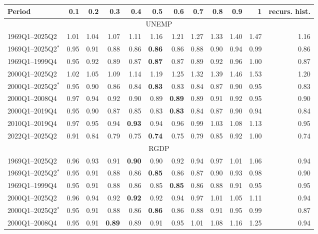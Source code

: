 \begin{tabular}{lrrrrrrrrrrr}
\hline
Period & 0.1 & 0.2 & 0.3 & 0.4 & 0.5 & 0.6 & 0.7 & 0.8 & 0.9 & 1 & recurs. hist. \\
\hline
\multicolumn{12}{c}{UNEMP} \\
1969Q1--2025Q2 & 1.01 & 1.04 & 1.07 & 1.11 & 1.16 & 1.21 & 1.27 & 1.33 & 1.40 & 1.47 & 1.16 \\
1969Q1--2025Q2$^*$ & 0.95 & 0.91 & 0.88 & 0.86 & \textbf{0.86} & 0.86 & 0.88 & 0.90 & 0.94 & 0.99 & 0.86 \\
1969Q1--1999Q4 & 0.95 & 0.92 & 0.89 & 0.87 & \textbf{0.87} & 0.87 & 0.89 & 0.92 & 0.96 & 1.00 & 0.87 \\
2000Q1--2025Q2 & 1.02 & 1.05 & 1.09 & 1.14 & 1.19 & 1.25 & 1.32 & 1.39 & 1.46 & 1.53 & 1.20 \\
2000Q1--2025Q2$^*$ & 0.95 & 0.90 & 0.86 & 0.84 & \textbf{0.83} & 0.83 & 0.84 & 0.87 & 0.90 & 0.95 & 0.83 \\
2000Q1--2008Q4 & 0.97 & 0.94 & 0.92 & 0.90 & 0.89 & \textbf{0.89} & 0.89 & 0.91 & 0.92 & 0.95 & 0.90 \\
2000Q1--2019Q4 & 0.95 & 0.90 & 0.87 & 0.85 & 0.83 & \textbf{0.83} & 0.84 & 0.87 & 0.90 & 0.94 & 0.84 \\
2010Q1--2019Q4 & 0.97 & 0.95 & 0.94 & \textbf{0.93} & 0.94 & 0.96 & 0.99 & 1.03 & 1.08 & 1.13 & 0.95 \\
2022Q1--2025Q2 & 0.91 & 0.84 & 0.79 & 0.75 & \textbf{0.74} & 0.75 & 0.79 & 0.85 & 0.92 & 1.00 & 0.74 \\
\hline
\multicolumn{12}{c}{RGDP} \\
1969Q1--2025Q2 & 0.96 & 0.93 & 0.91 & \textbf{0.90} & 0.90 & 0.92 & 0.94 & 0.97 & 1.01 & 1.06 & 0.94 \\
1969Q1--2025Q2$^*$ & 0.95 & 0.91 & 0.88 & 0.86 & \textbf{0.85} & 0.86 & 0.87 & 0.90 & 0.93 & 0.98 & 0.90 \\
1969Q1--1999Q4 & 0.95 & 0.91 & 0.88 & 0.86 & 0.85 & \textbf{0.85} & 0.86 & 0.88 & 0.91 & 0.95 & 0.95 \\
2000Q1--2025Q2 & 0.96 & 0.94 & 0.92 & \textbf{0.92} & 0.92 & 0.94 & 0.97 & 1.01 & 1.05 & 1.11 & 0.94 \\
2000Q1--2025Q2$^*$ & 0.95 & 0.91 & 0.88 & 0.86 & \textbf{0.86} & 0.86 & 0.88 & 0.91 & 0.95 & 0.99 & 0.87 \\
2000Q1--2008Q4 & 0.95 & 0.91 & \textbf{0.89} & 0.89 & 0.91 & 0.95 & 1.01 & 1.08 & 1.16 & 1.25 & 0.94 \\

\end{tabular}
